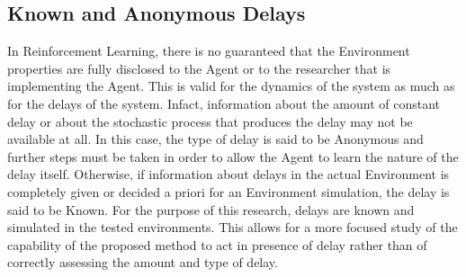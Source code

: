         \subsection{Known and Anonymous Delays}
            In Reinforcement Learning, there is no guaranteed that the Environment properties are fully disclosed to the Agent or to the researcher that is implementing the Agent. This is valid for the dynamics of the system as much as for the delays of the system. Infact, information about the amount of constant delay or about the stochastic process that produces the delay may not be available at all. In this case, the type of delay is said to be Anonymous and further steps must be taken in order to allow the Agent to learn the nature of the delay itself. Otherwise, if information about delays in the actual Environment is completely given or decided a priori for an Environment simulation, the delay is said to be Known. \newline
            For the purpose of this research, delays are known and simulated in the tested environments. This allows for a more focused study of the capability of the proposed method to act in presence of delay rather than of correctly assessing the amount and type of delay.
        